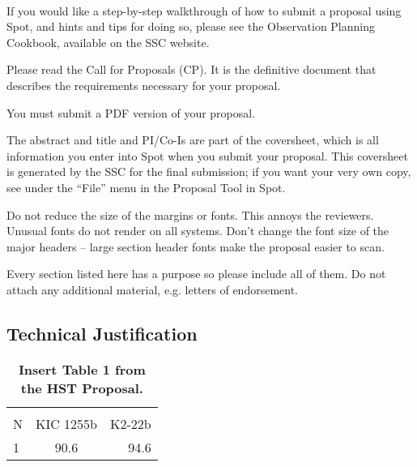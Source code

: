 \documentclass[letterpaper,12pt]{article}
\begin{document}

\\
If you would like a step-by-step walkthrough of how to submit a
proposal using Spot, and hints and tips for doing so, please see
the Observation Planning Cookbook, available on the SSC website.\newline

Please read the Call for Proposals (CP). It is
the definitive document that describes the requirements
necessary for your proposal. \newline 

You must submit a PDF version of your proposal. \newline

  The abstract and title and PI/Co-Is are part of
the coversheet, which is all information you enter into Spot
when you submit your proposal.  This coversheet is generated by
the SSC for the final submission; if you want your very own
copy, see under the ``File'' menu in the Proposal Tool in Spot.\newline

Do not reduce the size of the margins or fonts.  This annoys the reviewers.
Unusual fonts do not render on all systems.  Don't change the
font size of the major headers --  large section header
fonts make the proposal easier to scan. \newline

Every section listed here has a purpose so please include all of them.
Do not attach any additional material, e.g. letters of endorsement.



\subsection{Technical Justification}

\begin{table}[htbp]
   \centering
   \begin{tabular}{@{} lcr @{}} %
      \multicolumn{2}{c}{} \\
      N   & KIC 1255b & K2-22b \\
      \hline
      1      & 90.6 & 94.6 \\
   \end{tabular}
   \caption{\textbf{Insert Table 1 from the HST Proposal.}}
   \label{tab:probabilities}
\end{table}
\end{document}
